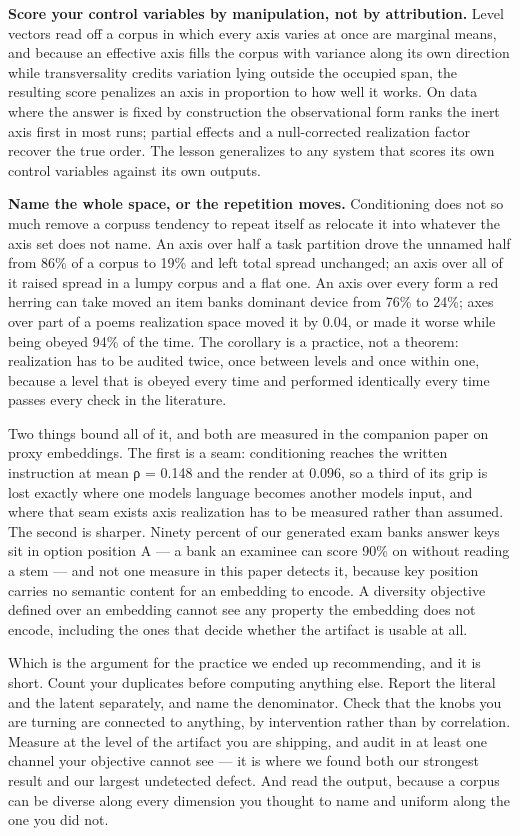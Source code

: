 \documentclass[
  10pt,
]{article}
\theoremstyle{plain}
\theoremstyle{definition}
\begin{document}
\textbf{Score your control variables by manipulation, not by
attribution.} Level vectors read off a corpus in which every axis varies
at once are marginal means, and because an effective axis fills the
corpus with variance along its own direction while transversality
credits variation lying outside the occupied span, the resulting score
penalizes an axis in proportion to how well it works. On data where the
answer is fixed by construction the observational form ranks the inert
axis first in most runs; partial effects and a null-corrected
realization factor recover the true order. The lesson generalizes to any
system that scores its own control variables against its own outputs.

\textbf{Name the whole space, or the repetition moves.} Conditioning
does not so much remove a corpus\textquotesingle s tendency to repeat
itself as relocate it into whatever the axis set does not name. An axis
over half a task partition drove the unnamed half from 86\% of a corpus
to 19\% and left total spread unchanged; an axis over all of it raised
spread in a lumpy corpus and a flat one. An axis over every form a red
herring can take moved an item bank\textquotesingle s dominant device
from 76\% to 24\%; axes over part of a poem\textquotesingle s
realization space moved it by 0.04, or made it worse while being obeyed
94\% of the time. The corollary is a practice, not a theorem:
realization has to be audited twice, once between levels and once within
one, because a level that is obeyed every time and performed identically
every time passes every check in the literature.

Two things bound all of it, and both are measured in the companion paper
on proxy embeddings. The first is a seam: conditioning reaches the
written instruction at mean ρ = 0.148 and the render at 0.096, so a
third of its grip is lost exactly where one model\textquotesingle s
language becomes another model\textquotesingle s input, and where that
seam exists axis realization has to be measured rather than assumed. The
second is sharper. Ninety percent of our generated exam
bank\textquotesingle s answer keys sit in option position A --- a bank
an examinee can score 90\% on without reading a stem --- and not one
measure in this paper detects it, because key position carries no
semantic content for an embedding to encode. A diversity objective
defined over an embedding cannot see any property the embedding does not
encode, including the ones that decide whether the artifact is usable at
all.

Which is the argument for the practice we ended up recommending, and it
is short. Count your duplicates before computing anything else. Report
the literal and the latent separately, and name the denominator. Check
that the knobs you are turning are connected to anything, by
intervention rather than by correlation. Measure at the level of the
artifact you are shipping, and audit in at least one channel your
objective cannot see --- it is where we found both our strongest result
and our largest undetected defect. And read the output, because a corpus
can be diverse along every dimension you thought to name and uniform
along the one you did not.
\end{document}
